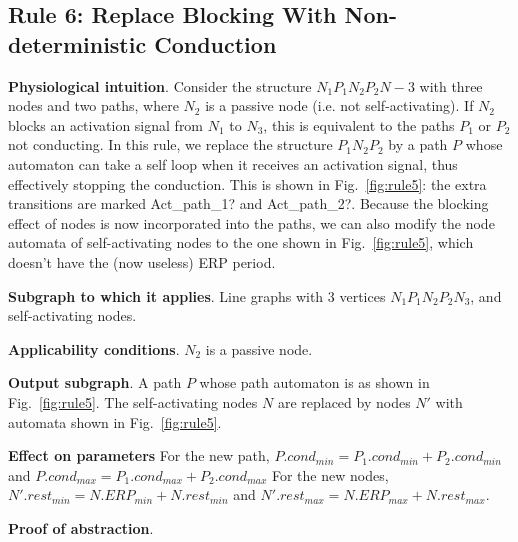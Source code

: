
\subsection{Rule 6: Replace Blocking With Non-deterministic Conduction}
\textbf{Physiological intuition}. 
Consider the structure $N_1 P_1 N_2 P_2 N-3$ with three nodes and two paths, where $N_2$ is a passive node (i.e. not self-activating).
If $N_2$ blocks an activation signal from $N_1$ to $N_3$, this is equivalent to the paths $P_1$ or $P_2$ not conducting.
In this rule, we replace the structure $P_1 N_2 P_2$ by a path $P$ whose automaton can take a self loop when it receives an activation signal, thus effectively stopping the conduction. 
This is shown in Fig.~\ref{fig:rule5}: the extra transitions are marked {\quattrofont Act\_path\_1?} and {\quattrofont Act\_path\_2?}.
Because the blocking effect of nodes is now incorporated into the paths, we can also modify the node automata of self-activating nodes to the one shown in Fig.~\ref{fig:rule5}, which doesn't have the (now useless) ERP period.

\textbf{Subgraph to which it applies}.
Line graphs with 3 vertices $N_1 P_1 N_2 P_2 N_3$, and self-activating nodes.

\textbf{Applicability conditions}.
$N_2$ is a passive node.

\textbf{Output subgraph}.
A path $P$ whose path automaton is as shown in Fig.~\ref{fig:rule5}.
The self-activating nodes $N$ are replaced by nodes $N'$ with automata shown in Fig.~\ref{fig:rule5}.

\textbf{Effect on parameters}
For the new path, $P.cond_{min}=P_1.cond_{min}+P_2.cond_{min}$ and 
$P.cond_{max}=P_1.cond_{max}+P_2.cond_{max}$
For the new nodes, $N'.rest_{min}=N.ERP_{min}+N.rest_{min}$ and 
$N'.rest_{max}=N.ERP_{max}+N.rest_{max}$.


\textbf{Proof of abstraction}.


